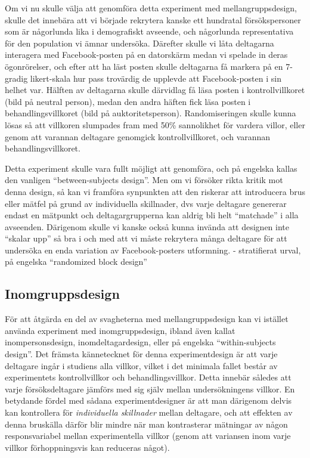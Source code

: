 \documentclass[
]{book}
\begin{document}
Om vi nu skulle välja att genomföra detta experiment med mellangruppsdesign, skulle det innebära att vi började rekrytera kanske ett hundratal försökspersoner som är någorlunda lika i demografiskt avseende, och någorlunda representativa för den population vi ämnar undersöka. Därefter skulle vi låta deltagarna interagera med Facebook-posten på en datorskärm medan vi spelade in deras ögonrörelser, och efter att ha läst posten skulle deltagarna få markera på en 7-gradig likert-skala hur pass trovärdig de upplevde att Facebook-posten i sin helhet var. Hälften av deltagarna skulle därvidlag få läsa posten i kontrollvillkoret (bild på neutral person), medan den andra häften fick läsa posten i behandlingsvillkoret (bild på auktoritetsperson). Randomiseringen skulle kunna lösas så att villkoren slumpades fram med 50\% sannolikhet för vardera villor, eller genom att varannan deltagare genomgick kontrollvillkoret, och varannan behandlingsvillkoret.

Detta experiment skulle vara fullt möjligt att genomföra, och på engelska kallas den vanligen ``between-subjects design''. Men om vi försöker rikta kritik mot denna design, så kan vi framföra synpunkten att den riskerar att introducera brus eller mätfel på grund av individuella skillnader, dvs varje deltagare genererar endast en mätpunkt och deltagargrupperna kan aldrig bli helt ``matchade'' i alla avseenden. Därigenom skulle vi kanske också kunna invända att designen inte ``skalar upp'' så bra i och med att vi måste rekrytera många deltagare för att undersöka en enda variation av Facebook-posters utformning. - stratifierat urval, på engelska ``randomized block design''

\hypertarget{sub07.5.4}{%
\subsection{Inomgruppsdesign}\label{sub07.5.4}}

För att åtgärda en del av svagheterna med mellangruppsdesign kan vi istället använda experiment med inomgruppsdesign, ibland även kallat inompersonsdesign, inomdeltagardesign, eller på engelska ``within-subjects design''. Det främsta kännetecknet för denna experimentdesign är att varje deltagare ingår i studiens alla villkor, vilket i det minimala fallet består av experimentets kontrollvillkor och behandlingsvillkor. Detta innebär således att varje försöksdeltagare jämförs med sig själv mellan undersökningens villkor. En betydande fördel med sådana experimentdesigner är att man därigenom delvis kan kontrollera för \emph{individuella skillnader} mellan deltagare, och att effekten av denna bruskälla därför blir mindre när man kontrasterar mätningar av någon responsvariabel mellan experimentella villkor (genom att variansen inom varje villkor förhoppningsvis kan reduceras något).
\end{document}
